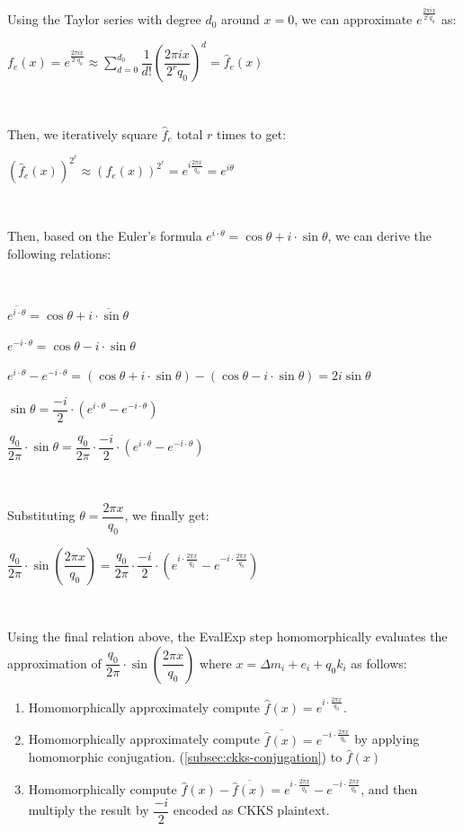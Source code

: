 Using the Taylor series with degree $d_0$ around $x = 0$, we can approximate $e^{\frac{2\pi i x}{2^r q_0}}$ as: 

$f_e(x) = e^{\frac{2\pi i x}{2^r q_0}} \approx \sum\limits_{d=0}^{d_0}\dfrac{1}{d!}\left(\dfrac{2\pi i x}{2^rq_0}\right)^d = \hat{f}_e(x)$

$ $

Then, we iteratively square $\hat{f}_e$ total $r$ times to get:

$(\hat{f}_e(x))^{2^r} \approx (f_e(x))^{2^r} = e^{i\frac{2\pi x}{q_0}} = e^{i\theta}$

$ $

Then, based on the Euler's formula $e^{i\cdot \theta} = \cos \theta + i \cdot \sin \theta$, we can derive the following relations:

$ $

$\overline{e^{i\cdot \theta}} = \cos \theta + \overline{i \cdot \sin \theta} $

$ e^{-i\cdot \theta} = \cos \theta - i \cdot \sin \theta$

$ e^{i\cdot \theta} - e^{-i\cdot \theta} = (\cos \theta + i \cdot \sin \theta) - (\cos \theta - i \cdot \sin \theta) = 2i\sin \theta$

$\sin \theta = \dfrac{-i}{2} \cdot (e^{i\cdot \theta} - e^{-i\cdot \theta})$

$\dfrac{q_0}{2\pi}\cdot \sin \theta = \dfrac{q_0}{2\pi}\cdot \dfrac{-i}{2} \cdot (e^{i\cdot \theta} - e^{-i\cdot \theta})$

$ $

Substituting $\theta = \dfrac{2\pi x}{q_0}$, we finally get: 

$\dfrac{q_0}{2\pi}\cdot \sin \left(\dfrac{2\pi x}{q_0}\right) = \dfrac{q_0}{2\pi}\cdot \dfrac{-i}{2} \cdot (e^{i\cdot \frac{2\pi x}{q_0}} - e^{-i\cdot \frac{2\pi x}{q_0}})$

$ $

Using the final relation above, the \textsf{EvalExp} step homomorphically evaluates the approximation of $\dfrac{q_0}{2\pi}\cdot \sin \left(\dfrac{2\pi x}{q_0}\right)$ where $x = \Delta m_i + e_i + q_0k_i$ as follows: 

\begin{enumerate}
\item Homomorphically approximately compute $\hat{f}(x) = e^{i\cdot \frac{2\pi x}{q_0}}$.
\item Homomorphically approximately compute $\overline{\hat{f}(x)} = e^{-i\cdot \frac{2\pi x}{q_0}}$ by applying homomorphic conjugation. (\autoref{subsec:ckks-conjugation}) to $\hat{f}(x)$
\item Homomorphically compute $\hat{f}(x) - \overline{\hat{f}(x)} = e^{i\cdot \frac{2\pi x}{q_0}} -  e^{-i\cdot \frac{2\pi x}{q_0}}$, and then multiply the result by $\dfrac{-i}{2}$ encoded as CKKS plaintext.
\end{enumerate}

